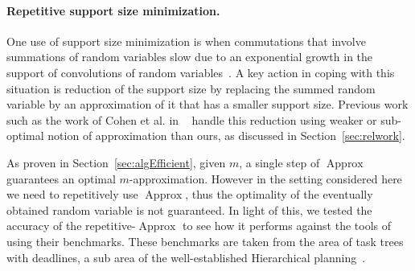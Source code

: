 \documentclass[letterpaper]{article} %
\DeclareMathOperator{\KlmApprox}{Approx}
\begin{document}
\paragraph{Repetitive support size minimization.} One use of support size minimization is when commutations that involve summations of random variables slow due to an exponential growth in the support of convolutions of random variables~\cite{cohen2015estimating}. A key action in coping with this situation is reduction of the  support size by replacing the summed random variable by an approximation of it that has a smaller support size. Previous work such as the work of Cohen et al. in ~\cite{cohen2015estimating,CohenGW18} handle this reduction using weaker or sub-optimal notion of approximation than ours, as discussed in Section~\ref{sec:relwork}. 

As proven in Section~\ref{sec:algEfficient}, given $m$, a single step of $\KlmApprox$ guarantees an optimal $m$-approximation. However in the setting considered here we need to repetitively use $\KlmApprox$, thus the optimality of the eventually obtained random variable is not guaranteed. In light of this, we tested the accuracy of the repetitive-$\KlmApprox$ to see how it performs against the tools of~\cite{cohen2015estimating,CohenGW18} using their benchmarks. These benchmarks are taken from the area of task trees with deadlines, a sub area of the well-established Hierarchical planning~\cite{thomas1988hierarchical,alford2016hierarchical,xiao2017hierarchical}.

\end{document}
